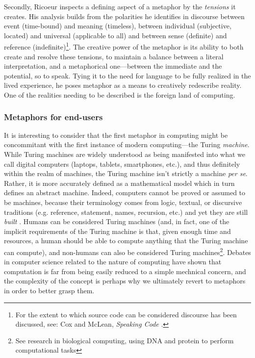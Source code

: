 Secondly, Ricoeur inspects a defining aspect of a metaphor by the \emph{tensions} it creates. His analysis builds from the polarities he identifies in discourse between event (time-bound) and meaning (timeless), between individual (subjective, located) and universal (applicable to all) and between sense (definite) and reference (indefinite)\footnote{For the extent to which source code can be considered discourse has been discussed, see: Cox and McLean, \emph{Speaking Code} \citep{cox_speaking_2013}.}. The creative power of the metaphor is its ability to both create and resolve these tensions, to maintain a balance between a literal interpretation, and a metaphorical one—between the immediate and the potential, so to speak. Tying it to the need for language to be fully realized in the lived experience, he poses metaphor as a means to creatively redescribe reality. One of the realities needing to be described is the foreign land of computing.


\subsubsection{Metaphors for end-users}

It is interesting to consider that the first metaphor in computing might be concommitant with the first instance of modern computing—the Turing \emph{machine}. While Turing machines are widely understood as being manifested into what we call digital computers (laptops, tablets, smartphones, etc.), and thus definitely within the realm of machines, the Turing machine isn't strictly a machine \emph{per se}. Rather, it is more accurately defined as a mathematical model which in turn defines an abstract machine. Indeed, computers cannot be proved or assumed to be machines, because their terminology comes from logic, textual, or discursive traditions (e.g. reference, statement, names, recursion, etc.) and yet they are still \emph{built} \citep{smith_origin_1998}. Humans can be considered Turing machines (and, in fact, one of the implicit requirements of the Turing machine is that, given enough time and resources, a human should be able to compute anything that the Turing machine can compute), and non-humans can also be considered Turing machines\footnote{See research in biological computing, using DNA and protein to perform computational tasks}. Debates in computer science related to the nature of computing \citep{rapaport_philosophy_2005} have shown that computation is far from being easily reduced to a simple mechnical concern, and the complexity of the concept is perhaps why we ultimately revert to metaphors in order to better grasp them.

